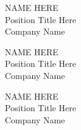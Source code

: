 \documentclass[12pt, a4paper, conference]{IEEEtran}
\begin{document}
\begin{minipage}[t][3cm][t]{0.3\textwidth}
\begin{center}
NAME HERE\\
Position Title Here\\
Company Name\\
{}
\end{center}
\end{minipage}
\begin{minipage}[t][3cm][t]{0.3\textwidth}
\begin{center}
NAME HERE\\
Position Title Here\\
Company Name\\
{}
\end{center}
\end{minipage}
\begin{minipage}[t][3cm][t]{0.3\textwidth}
\begin{center}
NAME HERE\\
Position Title Here\\
Company Name\\
{}
\end{center}
\end{minipage}
\end{document}
